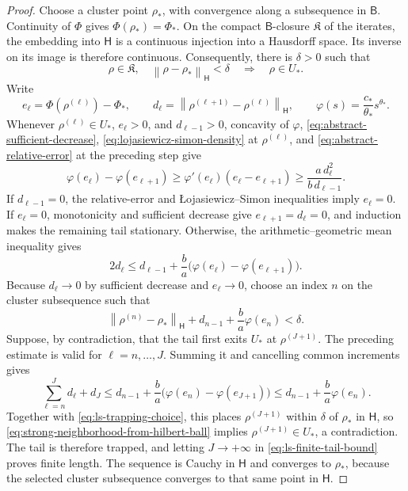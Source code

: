 \documentclass[11pt]{article}
\theoremstyle{definition}
\theoremstyle{remark}
\newcommand{\norm}[1]{\left\lVert #1\right\rVert}
\begin{document}
\begin{proof}
Choose a cluster point \(\rho_*\), with convergence along a subsequence in
\(\mathsf B\).  Continuity of \(\Phi\) gives
\(\Phi(\rho_*)=\Phi_*\).  On the compact \(\mathsf B\)-closure
\(\mathfrak K\) of the iterates, the embedding into \(\mathsf H\) is a
continuous injection into a Hausdorff space.  Its inverse on its image is
therefore continuous.  Consequently, there is \(\delta>0\) such that
\begin{equation}\label{eq:strong-neighborhood-from-hilbert-ball}
 \rho\in\mathfrak K,
 \quad
 \norm{\rho-\rho_*}_{\mathsf H}<\delta
 \quad\Longrightarrow\quad
 \rho\in U_*.
\end{equation}
Write
\[
 e_\ell=\Phi(\rho^{(\ell)})-\Phi_*,
 \qquad
 d_\ell=\norm{\rho^{(\ell+1)}-\rho^{(\ell)}}_{\mathsf H},
 \qquad
 \varphi(s)=\frac{c_*}{\theta_*}s^{\theta_*}.
\]
Whenever \(\rho^{(\ell)}\in U_*\), \(e_\ell>0\), and
\(d_{\ell-1}>0\), concavity of \(\varphi\),
\eqref{eq:abstract-sufficient-decrease},
\eqref{eq:lojasiewicz-simon-density} at \(\rho^{(\ell)}\), and
\eqref{eq:abstract-relative-error} at the preceding step give
\[
 \varphi(e_\ell)-\varphi(e_{\ell+1})
 \geq
 \varphi'(e_\ell)(e_\ell-e_{\ell+1})
 \geq
 \frac{a\,d_\ell^2}{b\,d_{\ell-1}}.
\]
If \(d_{\ell-1}=0\), the relative-error and
{\L}ojasiewicz--Simon inequalities imply \(e_\ell=0\).  If
\(e_\ell=0\), monotonicity and sufficient decrease give
\(e_{\ell+1}=d_\ell=0\), and induction makes the remaining tail stationary.
Otherwise, the arithmetic--geometric mean inequality gives
\[
 2d_\ell
 \leq
 d_{\ell-1}
 +
 \frac ba
 \bigl(\varphi(e_\ell)-\varphi(e_{\ell+1})\bigr).
\]
Because \(d_\ell\to0\) by sufficient decrease and \(e_\ell\to0\), choose
an index \(n\) on the cluster subsequence such that
\begin{equation}\label{eq:ls-trapping-choice}
 \norm{\rho^{(n)}-\rho_*}_{\mathsf H}
 +d_{n-1}+\frac ba\varphi(e_n)
 <\delta.
\end{equation}
Suppose, by contradiction, that the tail first exits \(U_*\) at
\(\rho^{(J+1)}\).  The preceding estimate is valid for
\(\ell=n,\ldots,J\).  Summing it and cancelling common increments gives
\begin{equation}\label{eq:ls-finite-tail-bound}
 \sum_{\ell=n}^{J}d_\ell+d_J
 \leq
 d_{n-1}+\frac ba
 \bigl(\varphi(e_n)-\varphi(e_{J+1})\bigr)
 \leq
 d_{n-1}+\frac ba\varphi(e_n).
\end{equation}
Together with \eqref{eq:ls-trapping-choice}, this places
\(\rho^{(J+1)}\) within \(\delta\) of \(\rho_*\) in \(\mathsf H\), so
\eqref{eq:strong-neighborhood-from-hilbert-ball} implies
\(\rho^{(J+1)}\in U_*\), a contradiction.  The tail is therefore trapped,
and letting \(J\to+\infty\) in \eqref{eq:ls-finite-tail-bound} proves
finite length.  The sequence is Cauchy in \(\mathsf H\) and converges to
\(\rho_*\), because the selected cluster subsequence converges to that same
point in \(\mathsf H\).
\end{proof}
\end{document}
